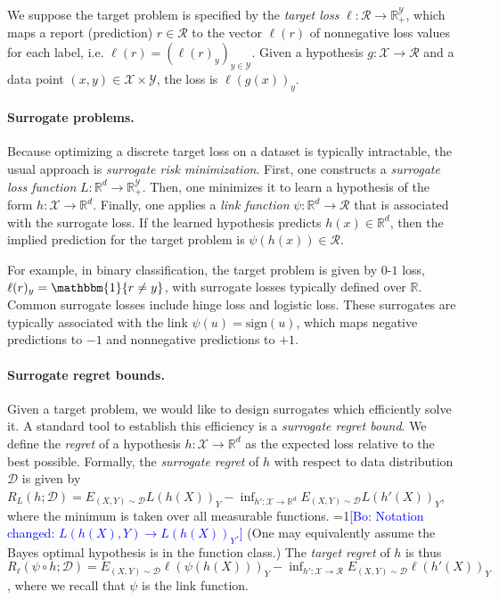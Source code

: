 \documentclass{article}
\newcommand{\Comments}{1}
\newcommand{\mynote}[2]{\ifnum\Comments=1\textcolor{#1}{#2}\fi}
\newcommand{\bo}[1]{\mynote{blue}{[Bo: #1]}}
\newcommand{\reals}{\mathbb{R}}
\newcommand{\D}{\mathcal{D}}
\newcommand{\R}{\mathcal{R}}
\newcommand{\X}{\mathcal{X}}
\newcommand{\Y}{\mathcal{Y}}
\newcommand{\ones}{\mathbbm{1}}
\begin{document}
We suppose the target problem is specified by the \emph{target loss} $\ell:\R\to\reals^\Y_+$, which maps a report (prediction) $r \in \R$ to the vector $\ell(r)$ of nonnegative loss values for each label, i.e. $\ell(r) = (\ell(r)_y)_{y\in\Y}$.
Given a hypothesis $g: \X \to \R$ and a data point $(x,y) \in \X \times \Y$, the loss is $\ell(g(x))_y$.

\paragraph{Surrogate problems.}
Because optimizing a discrete target loss on a dataset is typically intractable, the usual approach is \emph{surrogate risk minimization}.
First, one constructs a \emph{surrogate loss function} $L:\reals^d\to\reals^\Y_+$.
Then, one minimizes it to learn a hypothesis of the form $h: \X \to \reals^d$.
Finally, one applies a \emph{link function} $\psi: \reals^d \to \R$ that is associated with the surrogate loss.
If the learned hypothesis predicts $h(x) \in \reals^d$, then the implied prediction for the target problem is $\psi(h(x)) \in \R$.

For example, in binary classification, the target problem is given by $0$-$1$ loss, $\ell(r)_y = \ones\{r\neq y\}$, with surrogate losses typically defined over $\reals$.
Common surrogate losses include hinge loss and logistic loss.
These surrogates are typically associated with the link $\psi(u) = \mathrm{sign}(u)$, which maps negative predictions to $-1$ and nonnegative predictions to $+1$.

\paragraph{Surrogate regret bounds.}
Given a target problem, we would like to design surrogates which efficiently solve it.
A standard tool to establish this efficiency is a \emph{surrogate regret bound}.
We define the \emph{regret} of a hypothesis $h: \X \to \reals^d$ as the expected loss relative to the best possible.
Formally, the \emph{surrogate regret} of $h$ with respect to data distribution $\D$ is given by $R_L(h;\D) = E_{(X,Y)\sim\D} L(h(X))_Y - \inf_{h':\X\to\reals^d} E_{(X,Y)\sim\D} L(h'(X))_Y$, where the minimum is taken over all measurable functions.
\bo{Notation changed: $L(h(X),Y) \to L(h(X))_Y$.}
(One may equivalently assume the Bayes optimal hypothesis is in the function class.)
The \emph{target regret} of $h$ is thus $R_\ell(\psi\circ h;\D) = E_{(X,Y)\sim\D} \ell(\psi(h(X)))_Y - \inf_{h':\X\to\R} E_{(X,Y)\sim\D} \ell(h'(X))_Y$, where we recall that $\psi$ is the link function.
\end{document}
